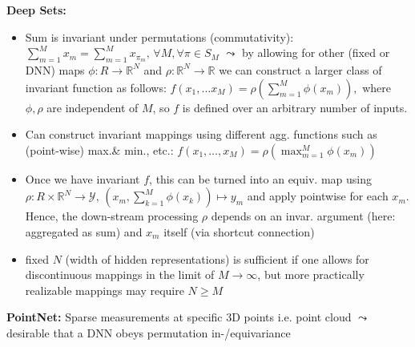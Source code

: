 \textbf{Deep Sets:}
\begin{itemize}
    \item Sum is invariant under permutations (commutativity): \(\sum_{m=1}^M x_m = \sum_{m=1}^M x_{\pi_m},\, \forall M, \forall\pi\in S_M\)
\(\leadsto\) by allowing for other (fixed or DNN) maps \(\phi:R \rightarrow \mathbb{R}^N\) and \(\rho: \mathbb{R}^N  \rightarrow \mathbb{R}\) we can construct a larger class of invariant function as follows: 
\(f(x_1, \ldots x_M)=\rho\left(\sum_{m=1}^M \phi(x_m)\right),\) where \(\phi, \rho\) are independent of \(M\), so \(f\) is defined over an arbitrary number of inputs. 
    \item Can construct invariant mappings using different agg. functions such as (point-wise) max.\& min., etc.: \(f(x_1, \ldots, x_M)=\rho\left(\max_{m=1}^M \phi(x_m)\right)\)
    \item Once we have invariant \(f\), this can be turned into an equiv. map using \(\rho: R\times \mathbb{R}^N \rightarrow \mathcal{Y}, \, \left(x_m, \sum_{k=1}^M \phi(x_k)\right) \mapsto y_m\) and apply pointwise for each \(x_m\). Hence, the down-stream processing \(\rho\) depends on an invar. argument (here: aggregated as sum) and \(x_m\) itself (via shortcut connection)
    \item fixed \(N\) (width of hidden representations) is sufficient if one allows for discontinuous mappings in the limit of \(M \rightarrow \infty\), but more practically realizable mappings may require \(N\geq M\)
\end{itemize}

\textbf{PointNet:} Sparse measurements at specific 3D points i.e. point cloud \(\leadsto\) desirable that a DNN obeys permutation in-/equivariance
